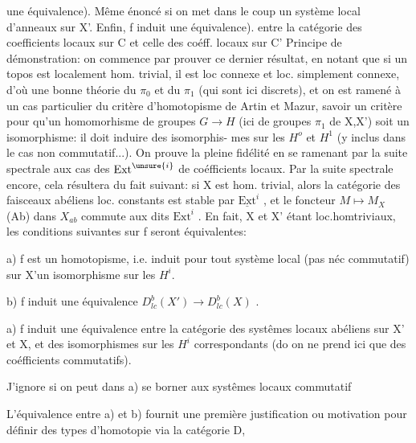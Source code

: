 
 une équivalence). Même énoncé si on met dans le
coup un  système local d'anneaux sur X'. Enfin, f induit 
 une équivalence).
 entre la catégorie des coefficients locaux sur C et celle
des coéff. locaux sur C' 
 Principe de démonstration: on commence
par prouver ce dernier résultat, en notant que  si un topos est
localement hom. trivial, il est loc connexe et loc. simplement connexe,
d'où une bonne théorie du $\pi_0$ et du $\pi_1$ (qui sont ici discrets), et on est
ramené  à un cas particulier du critère d'homotopisme de Artin et
Mazur, savoir un critère  \unsure{(}pour qu'un homomorhisme de groupes $G\to H$ (ici de
groupes $\pi_1$ de X,X') soit un isomorphisme: il doit induire des isomorphis-%
mes sur les $H^{o}$ et $H^{1}$ (y inclus dans le cas non commutatif...). On prouve
la pleine fidélité en se ramenant par la suite spectrale aux cas des $\mathrm{Ext}^{\unsure{i}}$
de coéfficients locaux. Par la suite spectrale encore, cela résultera du
fait suivant: si X est  hom. trivial, alors la catégorie des
faisceaux abéliens loc. constants  est stable par $\underline{\mathrm{Ext}}^{i}$ , et le foncteur
$M\mapsto M_{X}$  (Ab) dans $X_{ab}$ commute aux dits $\mathrm{Ext}^{i}$ .
En fait, X et X' étant loc.hom\hand{|}triviaux, les conditions suivantes sur f
seront équivalentes:

a) f est un homotopisme, i.e.  induit pour tout système local (pas
néc commutatif) sur X'un isomorphisme sur les $H^{i}$.

b)  f induit une équivalence $D^{b}_{lc}(X')\longrightarrow D^{b}_{lc}(X)$ .

a) f induit une équivalence entre la catégorie des systêmes locaux
abéliens sur X' et X, et des isomorphismes sur les $H^{i}$ correspondants (do
on ne prend ici que des coéfficients commutatifs).

 J'ignore si on peut dans a) se borner aux systêmes locaux commutatif

L'équivalence entre a) et b) fournit une première justification ou
motivation pour définir des types d'homotopie via la catégorie D,

